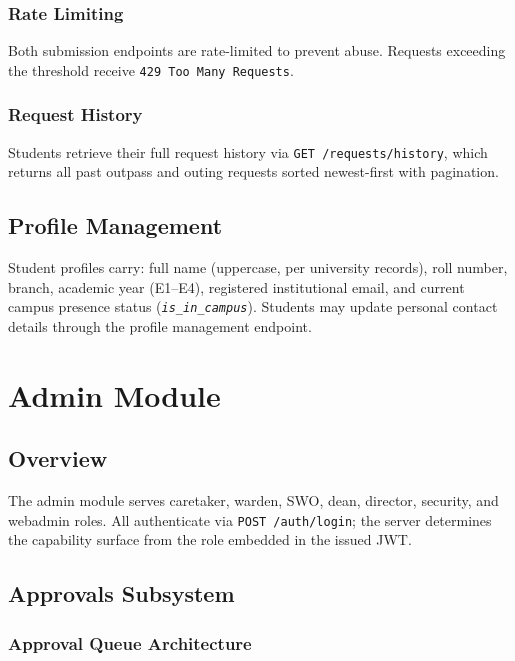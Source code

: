 \documentclass[12pt,a4paper]{report}
\newcommand{\api}[1]{\texttt{\small #1}}
\newcommand{\field}[1]{\texttt{\textit{#1}}}
\newcommand{\code}[1]{\texttt{#1}}
\begin{document}
\subsection{Rate Limiting}

Both submission endpoints are rate-limited to prevent abuse. Requests exceeding the threshold receive \code{429 Too Many Requests}.

\subsection{Request History}

Students retrieve their full request history via \api{GET /requests/history}, which returns all past outpass and outing requests sorted newest-first with pagination.

\section{Profile Management}

Student profiles carry: full name (uppercase, per university records), roll number, branch, academic year (E1--E4), registered institutional email, and current campus presence status (\field{is\_in\_campus}). Students may update personal contact details through the profile management endpoint.

\chapter{Admin Module}

\section{Overview}

The admin module serves caretaker, warden, SWO, dean, director, security, and webadmin roles. All authenticate via \api{POST /auth/login}; the server determines the capability surface from the role embedded in the issued JWT.

\section{Approvals Subsystem}

\subsection{Approval Queue Architecture}
\end{document}
